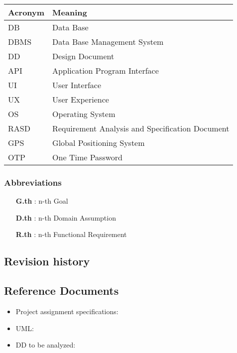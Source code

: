 \begin{tabular}{|l|l|}
\hline
Acronym & Meaning \\ \hline
DB & Data Base \\ \hline
DBMS & Data Base Management System \\ \hline
DD & Design Document \\ \hline
API & Application Program Interface \\ \hline
UI & User Interface \\ \hline
UX & User Experience \\ \hline
OS & Operating System \\ \hline
RASD & Requirement Analysis and Specification Document \\ \hline
GPS & Global Positioning System \\ \hline
OTP & One Time Password \\ 
\hline


\end{tabular}

\subsubsection{Abbreviations}

\begin{itemize}

\item [\textbf{G.th}]: n-th Goal

\item [\textbf{D.th}]: n-th Domain Assumption

\item [\textbf{R.th}]: n-th Functional Requirement

\end{itemize}


\subsection{Revision history}


\subsection{Reference Documents}

\begin{itemize}

\item Project assignment specifications:\cite{ASSIGNMENT}

\item UML: \cite{UML}

\item DD to be analyzed: \cite{DD}

\end{itemize}


